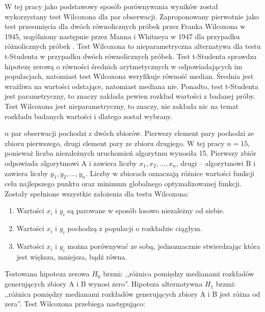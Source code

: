 \documentclass[a4paper,onecolumn,oneside,12pt,wide,floatssmall]{mwrep}
\theoremstyle{definition}
\theoremstyle{plain}%
\theoremstyle{remark}
\begin{document}
W tej pracy jako podstawowy sposób porównywania wyników został wykorzystany test 
Wilcoxona dla par obserwacji. Zaproponowany pierwotnie jako test przesunięcia dla dwóch równolicznych 
próbek przez Franka Wilcoxona w 1945, uogólniony następnie przez Manna i Whitneya w 1947
dla przypadku różnolicznych próbek \cite{mann}. Test Wilcoxona to nieparametryczna alternatywa dla testu t-Studenta w 
przypadku dwóch równolicznych próbek. Test t-Studenta sprawdza hipotezę zerową o równości
średnich arytmetycznych w odpowiadających im populacjach, natomiast test Wilcoxona
weryfikuje równość median. Średnia jest wrażliwa na wartości odstające,
natomiast mediana nie. Ponadto, test t-Studenta jest parametryczny, to znaczy zakłada pewien rozkład
wartości z badanej próby. Test Wilcoxona jest nieparametryczny, to znaczy,
nie zakłada nic na temat rozkładu badanych wartości i dlatego został wybrany.

$n$ par obserwacji pochodzi z dwóch zbiorów. Pierwszy element pary pochodzi ze zbioru pierwszego, drugi element pary 
ze zbioru drugiego. W tej pracy $n=15$,
ponieważ liczba niezależnych uruchomień algorytmu wynosiła 15. Pierwszy zbiór odpowiada algorytmowi A i zawiera
liczby $x_1, x_2, \dots, x_{n}$, drugi -- algorytmowi B i zawiera liczby $y_1, y_2, \dots, y_{n}$. 
Liczby w zbiorach oznaczają różnice wartości funkcji celu najlepszego punktu oraz minimum globalnego
optymalizowanej funkcji. Zostały spełnione wszystkie założenia dla testu Wilcoxona:

\begin{enumerate}
 \item Wartości $x_i$ i $y_i$ są parowane w sposób losowo niezależny od siebie. 
 \item Wartości $x_i$ i $y_i$ pochodzą z populacji o rozkładzie ciągłym.
 \item Wartości $x_i$ i $y_i$ można porównywać ze sobą, jednoznacznie stwierdzając która jest większa, mniejsza,
bądź równa.
\end{enumerate}

Testowana hipoteza zerowa $H_0$ brzmi: ,,różnica pomiędzy medianami rozkładów generujących zbiory A i B wynosi zero''.
Hipoteza alternatywna $H_1$ brzmi: ,,różnica pomiędzy medianami rozkładów generujących zbiory A i B jest różna od zera''.
Test Wilcoxona przebiega następująco:
\end{document}
